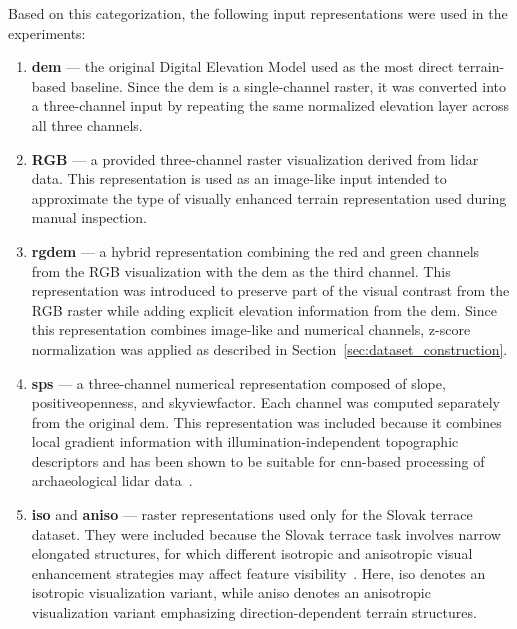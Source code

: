 Based on this categorization, the following input representations were used in the experiments:
\begin{enumerate}
    \item \textbf{\gls{dem}} --- the original Digital Elevation Model used as the most direct terrain-based baseline. Since the \gls{dem} is a single-channel raster, it was converted into a three-channel input by repeating the same normalized elevation layer across all three channels.

    \item \textbf{RGB} --- a provided three-channel raster visualization derived from \gls{lidar} data. This representation is used as an image-like input intended to approximate the type of visually enhanced terrain representation used during manual inspection.

    \item \textbf{\gls{rgdem}} --- a hybrid representation combining the red and green channels from the RGB visualization with the \gls{dem} as the third channel. This representation was introduced to preserve part of the visual contrast from the RGB raster while adding explicit elevation information from the \gls{dem}. Since this representation combines image-like and numerical channels, z-score normalization was applied as described in Section~\ref{sec:dataset_construction}.

    \item \textbf{\gls{sps}} --- a three-channel numerical representation composed of \gls{slope}, \gls{positiveopenness}, and \gls{skyviewfactor}. Each channel was computed separately from the original \gls{dem}. This representation was included because it combines local gradient information with illumination-independent topographic descriptors and has been shown to be suitable for \gls{cnn}-based processing of archaeological \gls{lidar} data~\cite{zhang_unveiling_2024}.

    \item \textbf{\gls{iso}} and \textbf{\gls{aniso}} --- raster representations used only for the Slovak terrace dataset. They were included because the Slovak terrace task involves narrow elongated structures, for which different isotropic and anisotropic visual enhancement strategies may affect feature visibility~\cite{doneus_openness_2013}. Here, \gls{iso} denotes an isotropic visualization variant, while \gls{aniso} denotes an anisotropic visualization variant emphasizing direction-dependent terrain structures.

\end{enumerate}

